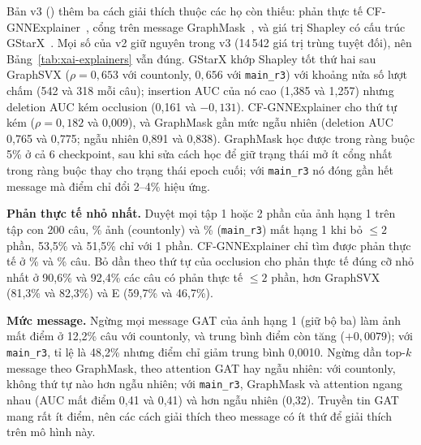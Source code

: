 Bản v3 () thêm ba cách giải thích thuộc các họ còn thiếu: phản thực tế CF-GNNExplainer~\cite{xai-lucic2022cfgnn}, cổng trên message GraphMask~\cite{xai-schlichtkrull2021graphmask}, và giá trị Shapley có cấu trúc GStarX~\cite{xai-zhang2022gstarx}.
Mọi số của v2 giữ nguyên trong v3 (14\,542 giá trị trùng tuyệt đối), nên Bảng~\ref{tab:xai-explainers} vẫn đúng.
GStarX khớp Shapley tốt thứ hai sau GraphSVX ($\rho=0{,}653$ với countonly, $0{,}656$ với \texttt{main\_r3}) với khoảng nửa số lượt chấm (542 và 318 mỗi câu); insertion AUC của nó cao (1,385 và 1,257) nhưng deletion AUC kém occlusion (0,161 và $-0{,}131$).
CF-GNNExplainer cho thứ tự kém ($\rho=0{,}182$ và 0,009), và GraphMask gần mức ngẫu nhiên (deletion AUC 0,765 và 0,775; ngẫu nhiên 0,891 và 0,838).
GraphMask học được trong ràng buộc 5\% ở cả 6 checkpoint, sau khi sửa cách học để giữ trạng thái mở ít cổng nhất trong ràng buộc thay cho trạng thái epoch cuối; với \texttt{main\_r3} nó đóng gần hết message mà điểm chỉ đổi 2--4\% hiệu ứng.

\textbf{Phản thực tế nhỏ nhất.}
Duyệt mọi tập 1 hoặc 2 phần của ảnh hạng 1 trên tập con 200 câu, \% ảnh (countonly) và \% (\texttt{main\_r3}) mất hạng 1 khi bỏ $\le 2$ phần, 53,5\% và 51,5\% chỉ với 1 phần.
CF-GNNExplainer chỉ tìm được phản thực tế ở \% và \% câu.
Bỏ dần theo thứ tự của occlusion cho phản thực tế đúng cỡ nhỏ nhất ở 90,6\% và 92,4\% các câu có phản thực tế $\le 2$ phần, hơn GraphSVX (81,3\% và 82,3\%) và E (59,7\% và 46,7\%).

\textbf{Mức message.}
Ngừng mọi message GAT của ảnh hạng 1 (giữ bộ ba) làm ảnh mất điểm ở 12,2\% câu với countonly, và trung bình điểm còn tăng ($+0{,}0079$); với \texttt{main\_r3}, tỉ lệ là 48,2\% nhưng điểm chỉ giảm trung bình 0,0010.
Ngừng dần top-$k$ message theo GraphMask, theo attention GAT hay ngẫu nhiên: với countonly, không thứ tự nào hơn ngẫu nhiên; với \texttt{main\_r3}, GraphMask và attention ngang nhau (AUC mất điểm 0,41 và 0,41) và hơn ngẫu nhiên (0,32).
Truyền tin GAT mang rất ít điểm, nên các cách giải thích theo message có ít thứ để giải thích trên mô hình này.

